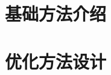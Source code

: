 \documentclass[10pt]{beamer}
\begin{document}






\section{基础方法介绍}

\section{优化方法设计}
\end{document}
